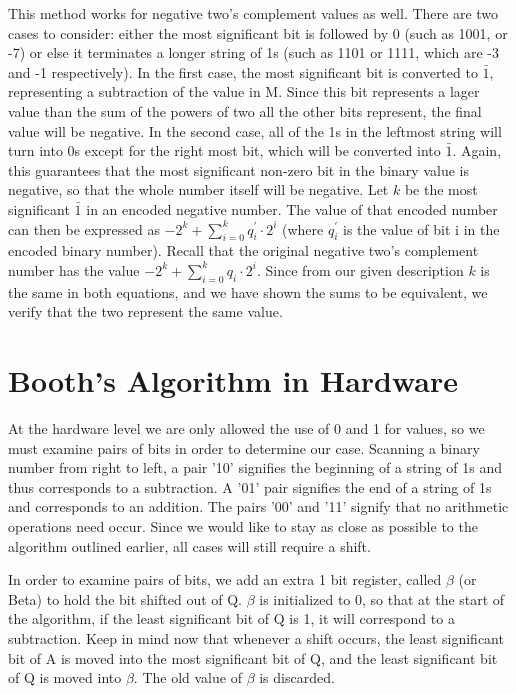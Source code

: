 \documentclass{article}
\begin{document}
This method works for negative two's complement values as well.
There are two cases to consider: either the most significant bit is followed by 0 (such as 1001, or -7) or else it terminates a longer string of 1s (such as 1101 or 1111, which are -3 and -1 respectively).
In the first case, the most significant bit is converted to $\bar{1}$, representing a subtraction of the value in M.
Since this bit represents a lager value than the sum of the powers of two all the other bits represent, the final value will be negative.
In the second case, all of the 1s in the leftmost string will turn into 0s except for the right most bit, which will be converted into $\bar{1}$.
Again, this guarantees that the most significant non-zero bit in the binary value is negative, so that the whole number itself will be negative.
Let $k$ be the most significant $\bar{1}$ in an encoded negative number.
The value of that encoded number can then be expressed as $-2^k + \sum_{i=0}^k q_i^{\prime} \cdot 2^i$ (where $q_i^{\prime}$ is the value of bit i in the encoded binary number).
Recall that the original negative two's complement number has the value $-2^k + \sum_{i=0}^k q_i \cdot 2^i$.
Since from our given description $k$ is the same in both equations, and we have shown the sums to be equivalent, we verify that the two represent the same value.


\section{Booth's Algorithm in Hardware}
    At the hardware level we are only allowed the use of 0 and 1 for values, so we must examine pairs of bits in order to determine our case.
Scanning a binary number from right to left, a pair '10' signifies the beginning of a string of 1s and thus corresponds to a subtraction.
A '01' pair signifies the end of a string of 1s and corresponds to an addition.
The pairs '00' and '11' signify that no arithmetic operations need occur.
Since we would like to stay as close as possible to the algorithm outlined earlier, all cases will still require a shift.

    In order to examine pairs of bits, we add an extra 1 bit register, called $\beta$ (or Beta) to hold the bit shifted out of Q.
$\beta$ is initialized to 0, so that at the start of the algorithm, if the least significant bit of Q is 1, it will correspond to a subtraction.
Keep in mind now that whenever a shift occurs, the least significant bit of A is moved into the most significant bit of Q, and the least significant bit of Q is moved into $\beta$.
The old value of $\beta$ is discarded.
\end{document}
